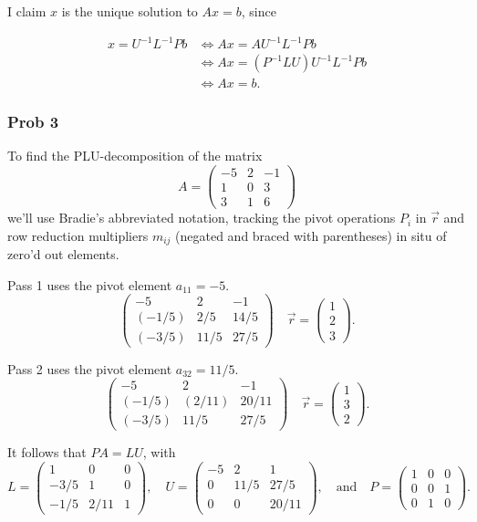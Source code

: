 \documentclass[titlepage,11pt]{article}
\begin{document}
I claim \(x\) is the unique solution to \(Ax = b\), since

\begin{align}
  x = U^{-1}L^{-1}Pb &\iff Ax = AU^{-1}L^{-1}Pb\\
    &\iff Ax = (P^{-1}LU)U^{-1}L^{-1}Pb\\
    &\iff Ax = b.
\end{align}

    \subsubsection{Prob 3}\label{prob-3}

To find the PLU-decomposition of the matrix \[A = 
  \begin{pmatrix}
    -5  &   2  &   -1   \\
    1  &   0  &   3   \\
    3  &   1  &   6
  \end{pmatrix}\] we'll use Bradie's abbreviated notation, tracking the
pivot operations \(P_i\) in \(\vec{r}\) and row reduction multipliers
\(m_{ij}\) (negated and braced with parentheses) in situ of zero'd out
elements.

Pass 1 uses the pivot element \(a_{11} = -5\). \[\begin{pmatrix}
    -5  &   2  &   -1   \\
    (-1/5) &  2/5  &   14/5\\
    (-3/5)  &   11/5 &   27/5
  \end{pmatrix}
  \quad
  \vec{r} = \begin{pmatrix}1\\2\\3\end{pmatrix}.\]

Pass 2 uses the pivot element \(a_{32} = 11/5\). \[\begin{pmatrix}
    -5  &   2  &   -1   \\
    (-1/5) &  (2/11) &  20/11\\
    (-3/5)  &   11/5 &   27/5
  \end{pmatrix}
  \quad
  \vec{r} = \begin{pmatrix}1\\3\\2\end{pmatrix}.\]

It follows that \(PA = LU\), with \[L =
  \begin{pmatrix}
  1 & 0 & 0\\
  -3/5 & 1 & 0\\
  -1/5 & 2/11 & 1
  \end{pmatrix},
  \quad
  U = 
  \begin{pmatrix}
  -5 & 2 & 1\\
  0 & 11/5 & 27/5\\
  0 & 0 & 20/11
  \end{pmatrix},
  \quad\text{and}\quad
  P = 
  \begin{pmatrix}
  1 & 0 &0\\
  0 &0&1\\
  0&1&0
  \end{pmatrix}.\]
\end{document}

